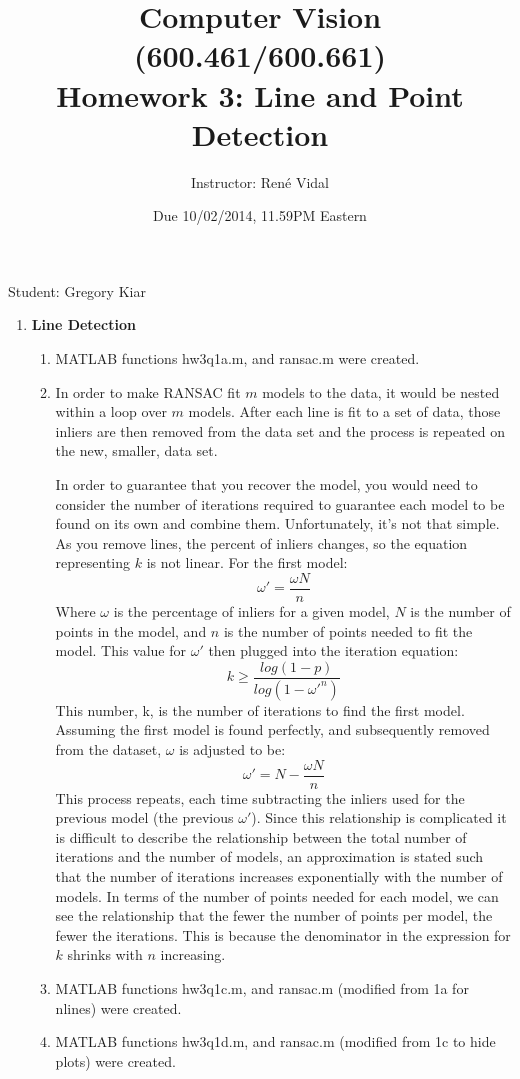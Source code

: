 \documentclass[10pt]{article}
\begin{document}
\title{
\vspace{-19mm}
Computer Vision (600.461/600.661)\\
Homework 3: Line and Point Detection}
\author{Instructor: Ren\'e Vidal}
\date{Due 10/02/2014, 11.59PM Eastern}

\maketitle

Student: Gregory Kiar
\begin{enumerate}

\item \textbf{Line Detection} 
%
\begin{enumerate}
\item MATLAB functions hw3q1a.m, and ransac.m were created.
\item In order to make RANSAC fit $m$ models to the data, it would be nested within a loop over $m$ models. After each line is fit to a set of data, those inliers are then removed from the data set and the process is repeated on the new, smaller, data set.

In order to guarantee that you recover the model, you would need to consider the number of iterations required to guarantee each model to be found on its own and combine them. Unfortunately, it's not that simple. As you remove lines, the percent of inliers changes, so the equation representing $k$ is not linear. For the first model:
\begin{equation}
\omega' = \frac{\omega N}{n}
\end{equation}
Where $\omega$ is the percentage of inliers for a given model, $N$ is the number of points in the model, and $n$ is the number of points needed to fit the model. This value for $\omega'$ then plugged into the iteration equation:
\begin{equation}
k \geq \frac{log(1-p)}{log(1-\omega'^n)}
\end{equation}
This number, k, is the number of iterations to find the first model. Assuming the first model is found perfectly, and subsequently removed from the dataset, $\omega$ is adjusted to be:
\begin{equation}
\omega' = N- \frac{\omega N}{n}
\end{equation}
This process repeats, each time subtracting the inliers used for the previous model (the previous $\omega'$). Since this relationship is complicated it is difficult to describe the relationship between the total number of iterations and the number of models, an approximation is stated such that the number of iterations increases exponentially with the number of models. In terms of the number of points needed for each model, we can see the relationship that the fewer the number of points per model, the fewer the iterations. This is because the denominator in the expression for $k$ shrinks with $n$ increasing.
\item MATLAB functions hw3q1c.m, and ransac.m (modified from 1a for nlines) were created.
\item MATLAB functions hw3q1d.m, and ransac.m (modified from 1c to hide plots) were created.
\end{enumerate}


\end{enumerate}
\end{document}
